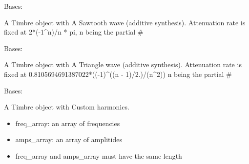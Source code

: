 \documentclass[letterpaper,10pt,english]{sphinxmanual}
\begin{document}
\begin{fulllineitems}
\label{index:Timbre.generators.Sawtooth}
Bases: {\hyperref[index:Timbre.timbre.Timbre]{\emph{}}}

A Timbre object with A Sawtooth wave (additive synthesis). Attenuation rate is fixed at 2*(-1\textasciicircum{}n)/n * pi, n being the partial \#

\end{fulllineitems}


\begin{fulllineitems}
\label{index:Timbre.generators.Triangle}
Bases: {\hyperref[index:Timbre.timbre.Timbre]{\emph{}}}

A Timbre object with A Triangle wave (additive synthesis). Attenuation rate is fixed at 0.8105694691387022*((-1)\textasciicircum{}((n - 1)/2.)/(n\textasciicircum{}2)) n being the partial \#

\end{fulllineitems}


\begin{fulllineitems}
\label{index:Timbre.generators.Custom}
Bases: {\hyperref[index:Timbre.timbre.Timbre]{\emph{}}}

A Timbre object with Custom harmonics.
\begin{itemize}
\item {} 
freq\_array: an array of frequencies

\item {} 
amps\_array: an array of amplitides

\item {} 
freq\_array and amps\_array must have the same length

\end{itemize}

\end{fulllineitems}

\end{document}

